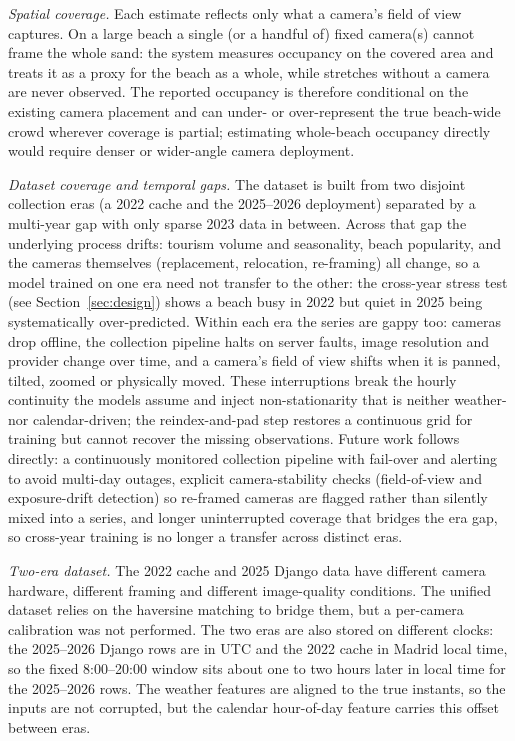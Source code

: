 \documentclass[twocolumn,twoside,a4paper,10pt]{IEEEtran}
\begin{document}
\textit{Spatial coverage.} Each estimate reflects only what a camera's field of view captures. On a large beach a single (or a handful of) fixed camera(s) cannot frame the whole sand: the system measures occupancy on the covered area and treats it as a proxy for the beach as a whole, while stretches without a camera are never observed. The reported occupancy is therefore conditional on the existing camera placement and can under- or over-represent the true beach-wide crowd wherever coverage is partial; estimating whole-beach occupancy directly would require denser or wider-angle camera deployment.

\textit{Dataset coverage and temporal gaps.} The dataset is built from two disjoint collection eras (a 2022 cache and the 2025--2026 deployment) separated by a multi-year gap with only sparse 2023 data in between. Across that gap the underlying process drifts: tourism volume and seasonality, beach popularity, and the cameras themselves (replacement, relocation, re-framing) all change, so a model trained on one era need not transfer to the other: the cross-year stress test (see Section~\ref{sec:design}) shows a beach busy in 2022 but quiet in 2025 being systematically over-predicted. Within each era the series are gappy too: cameras drop offline, the collection pipeline halts on server faults, image resolution and provider change over time, and a camera's field of view shifts when it is panned, tilted, zoomed or physically moved. These interruptions break the hourly continuity the models assume and inject non-stationarity that is neither weather- nor calendar-driven; the reindex-and-pad step restores a continuous grid for training but cannot recover the missing observations. Future work follows directly: a continuously monitored collection pipeline with fail-over and alerting to avoid multi-day outages, explicit camera-stability checks (field-of-view and exposure-drift detection) so re-framed cameras are flagged rather than silently mixed into a series, and longer uninterrupted coverage that bridges the era gap, so cross-year training is no longer a transfer across distinct eras.

\textit{Two-era dataset.} The 2022 cache and 2025 Django data have different camera hardware, different framing and different image-quality conditions. The unified dataset relies on the haversine matching to bridge them, but a per-camera calibration was not performed. The two eras are also stored on different clocks: the 2025--2026 Django rows are in UTC and the 2022 cache in Madrid local time, so the fixed 8:00--20:00 window sits about one to two hours later in local time for the 2025--2026 rows. The weather features are aligned to the true instants, so the inputs are not corrupted, but the calendar hour-of-day feature carries this offset between eras.
\end{document}
